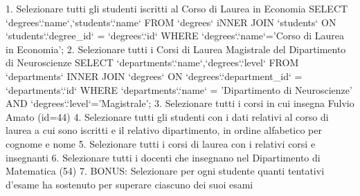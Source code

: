 1. Selezionare tutti gli studenti iscritti al Corso di Laurea in Economia
SELECT `degrees`.`name`,`students`.`name` FROM `degrees` iNNER JOIN `students` ON `students`.`degree_id` = `degrees`.`id` WHERE `degrees`.`name`='Corso di Laurea in Economia';
2. Selezionare tutti i Corsi di Laurea Magistrale del Dipartimento di Neuroscienze
SELECT `departments`.`name`,`degrees`.`level` FROM `departments` INNER JOIN `degrees` ON `degrees`.`department_id` = `departments`.`id` WHERE `departments`.`name` = 'Dipartimento di Neuroscienze' AND `degrees`.`level`='Magistrale';
3. Selezionare tutti i corsi in cui insegna Fulvio Amato (id=44)
4. Selezionare tutti gli studenti con i dati relativi al corso di laurea a cui sono iscritti e il
relativo dipartimento, in ordine alfabetico per cognome e nome
5. Selezionare tutti i corsi di laurea con i relativi corsi e insegnanti
6. Selezionare tutti i docenti che insegnano nel Dipartimento di Matematica (54)
7. BONUS: Selezionare per ogni studente quanti tentativi d’esame ha sostenuto per
superare ciascuno dei suoi esami